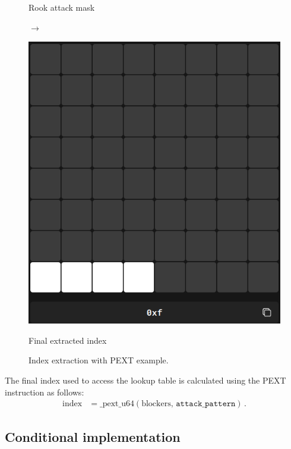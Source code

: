 \begin{figure}[H]
\begin{minipage}[c]{0.3\textwidth}
        \caption*{Rook attack mask}
    \end{minipage}
    \hfill
    \begin{minipage}[c]{0.05\textwidth}
        \centering
        \Huge\texttt{$\rightarrow$}
    \end{minipage}
    \hfill
    \begin{minipage}[c]{0.3\textwidth}
        \centering
        \includegraphics[width=\textwidth]{Imagenes/pext_final_index.png}
        \caption*{Final extracted index}
    \end{minipage}
    \caption*{Index extraction with PEXT example.}\label{fig:pext_bitboards}
\end{figure}

\noindent The final index used to access the lookup table is calculated using the PEXT instruction as follows:
\begin{align*}
    \text{index}
    &= \text{\_pext\_u64}(\text{blockers},\,\texttt{attack\_pattern})\,.
\end{align*}

\subsection*{Conditional implementation}

